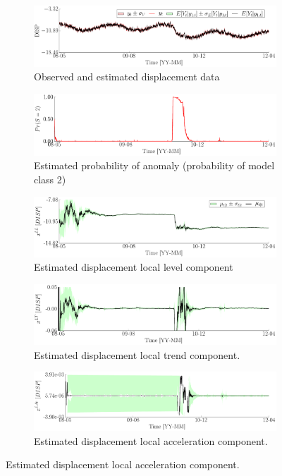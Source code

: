 \begin{figure}[h!]
\centering
\begin{subfigure}{\linewidth}
\includegraphics[width=0.9\linewidth]{./docfigs/Example_DISPSIM_ANOMALY/optim_param_default_initialhiddenstate/DISP_ObservedPredicted.pdf}
\caption{Observed and estimated displacement data}
\end{subfigure}
\begin{subfigure}{\linewidth}
\includegraphics[width=0.9\linewidth]{./docfigs/Example_DISPSIM_ANOMALY/optim_param_default_initialhiddenstate/ModelProbability.pdf} 
\caption{Estimated probability of anomaly (probability of model class 2)}
\end{subfigure}
\begin{subfigure}{\linewidth}
\includegraphics[width=0.9\linewidth]{./docfigs/Example_DISPSIM_ANOMALY/optim_param_default_initialhiddenstate/DISP_LL_1.pdf} 
\caption{Estimated displacement local level component}
\end{subfigure}
\begin{subfigure}{\linewidth}
\includegraphics[width=0.9\linewidth]{./docfigs/Example_DISPSIM_ANOMALY/optim_param_default_initialhiddenstate/DISP_LT_2.pdf}
\caption{Estimated displacement local trend component.}
\end{subfigure}
\begin{subfigure}{\linewidth}
\includegraphics[width=0.9\linewidth]{./docfigs/Example_DISPSIM_ANOMALY/optim_param_default_initialhiddenstate/DISP_LAc_3.pdf}
\caption{Estimated displacement local acceleration component.}
\end{subfigure}
\end{figure}
